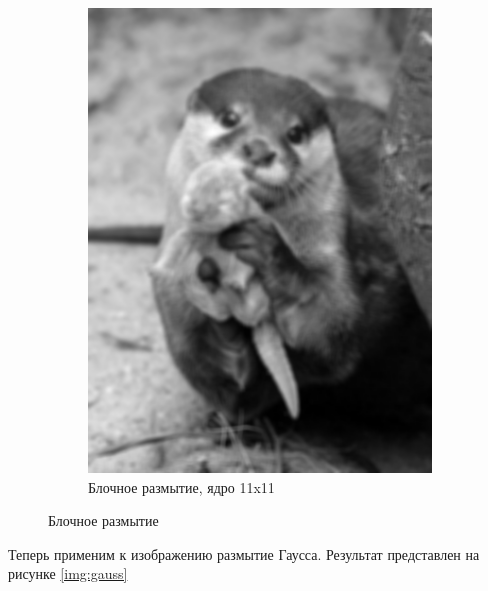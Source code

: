 \begin{figure}[ht!]
\begin{subfigure}[b]{0.5\linewidth}
        \includegraphics[width=0.95\linewidth]{block_11.png}
        \caption{Блочное размытие, ядро 11x11}
    \end{subfigure}
    \caption{Блочное размытие}
    \label{img:block}
\end{figure}

Теперь применим к изображению размытие Гаусса. Результат представлен на рисунке \ref{img:gauss}

